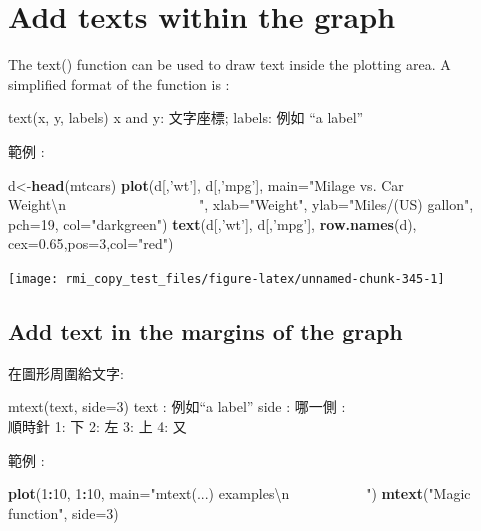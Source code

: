 \documentclass[]{book}
\newenvironment{Shaded}{\begin{snugshade}}{\end{snugshade}}
\newcommand{\CharTok}[1]{\textcolor[rgb]{0.31,0.60,0.02}{#1}}
\newcommand{\DataTypeTok}[1]{\textcolor[rgb]{0.13,0.29,0.53}{#1}}
\newcommand{\DecValTok}[1]{\textcolor[rgb]{0.00,0.00,0.81}{#1}}
\newcommand{\FloatTok}[1]{\textcolor[rgb]{0.00,0.00,0.81}{#1}}
\newcommand{\KeywordTok}[1]{\textcolor[rgb]{0.13,0.29,0.53}{\textbf{#1}}}
\newcommand{\NormalTok}[1]{#1}
\newcommand{\OperatorTok}[1]{\textcolor[rgb]{0.81,0.36,0.00}{\textbf{#1}}}
\newcommand{\StringTok}[1]{\textcolor[rgb]{0.31,0.60,0.02}{#1}}
\theoremstyle{definition}
\theoremstyle{definition}
\theoremstyle{definition}
\theoremstyle{remark}
\begin{document}
\hypertarget{add-texts-within-the-graph}{%
\section{Add texts within the graph}\label{add-texts-within-the-graph}}

The text() function can be used to draw text inside the plotting area. A
simplified format of the function is :

text(x, y, labels) x and y: 文字座標; labels: 例如 ``a label''

範例 :

\begin{Shaded}
\begin{Highlighting}[]
\NormalTok{d<-}\KeywordTok{head}\NormalTok{(mtcars)}
\KeywordTok{plot}\NormalTok{(d[,}\StringTok{'wt'}\NormalTok{], d[,}\StringTok{'mpg'}\NormalTok{], }
     \DataTypeTok{main=}\StringTok{"Milage vs. Car Weight}\CharTok{\textbackslash{}n}\StringTok{~~~~~~~~~~~~~~~~~~~"}\NormalTok{,}
      \DataTypeTok{xlab=}\StringTok{"Weight"}\NormalTok{, }\DataTypeTok{ylab=}\StringTok{"Miles/(US) gallon"}\NormalTok{,}
      \DataTypeTok{pch=}\DecValTok{19}\NormalTok{, }\DataTypeTok{col=}\StringTok{"darkgreen"}\NormalTok{)}
\KeywordTok{text}\NormalTok{(d[,}\StringTok{'wt'}\NormalTok{], d[,}\StringTok{'mpg'}\NormalTok{],  }\KeywordTok{row.names}\NormalTok{(d),     }\DataTypeTok{cex=}\FloatTok{0.65}\NormalTok{,}\DataTypeTok{pos=}\DecValTok{3}\NormalTok{,}\DataTypeTok{col=}\StringTok{"red"}\NormalTok{) }
\end{Highlighting}
\end{Shaded}

\begin{center}\texttt{[image: rmi\_copy\_test\_files/figure-latex/unnamed-chunk-345-1]} \end{center}

\hypertarget{add-text-in-the-margins-of-the-graph}{%
\subsection{Add text in the margins of the
graph}\label{add-text-in-the-margins-of-the-graph}}

在圖形周圍給文字:

mtext(text, side=3) text : 例如``a label'' side : 哪一側 :\\
順時針 1: 下 2: 左 3: 上 4: 又

範例 :

\begin{Shaded}
\begin{Highlighting}[]
\KeywordTok{plot}\NormalTok{(}\DecValTok{1}\OperatorTok{:}\DecValTok{10}\NormalTok{, }\DecValTok{1}\OperatorTok{:}\DecValTok{10}\NormalTok{, }
     \DataTypeTok{main=}\StringTok{"mtext(...) examples}\CharTok{\textbackslash{}n}\StringTok{~~~~~~~~~~~"}\NormalTok{)}
\KeywordTok{mtext}\NormalTok{(}\StringTok{"Magic function"}\NormalTok{, }\DataTypeTok{side=}\DecValTok{3}\NormalTok{)}
\end{Highlighting}
\end{Shaded}
\end{document}
